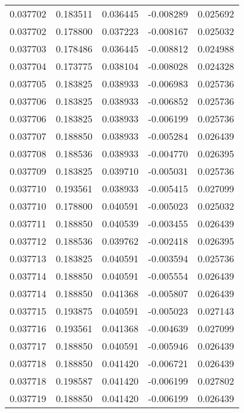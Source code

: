 \begin{tabular}{lrrrr}
0.037702    &  0.183511 &  0.036445 & -0.008289 &             0.025692 \\
0.037702    &  0.178800 &  0.037223 & -0.008167 &             0.025032 \\
0.037703    &  0.178486 &  0.036445 & -0.008812 &             0.024988 \\
0.037704    &  0.173775 &  0.038104 & -0.008028 &             0.024328 \\
0.037705    &  0.183825 &  0.038933 & -0.006983 &             0.025736 \\
0.037706    &  0.183825 &  0.038933 & -0.006852 &             0.025736 \\
0.037706    &  0.183825 &  0.038933 & -0.006199 &             0.025736 \\
0.037707    &  0.188850 &  0.038933 & -0.005284 &             0.026439 \\
0.037708    &  0.188536 &  0.038933 & -0.004770 &             0.026395 \\
0.037709    &  0.183825 &  0.039710 & -0.005031 &             0.025736 \\
0.037710    &  0.193561 &  0.038933 & -0.005415 &             0.027099 \\
0.037710    &  0.178800 &  0.040591 & -0.005023 &             0.025032 \\
0.037711    &  0.188850 &  0.040539 & -0.003455 &             0.026439 \\
0.037712    &  0.188536 &  0.039762 & -0.002418 &             0.026395 \\
0.037713    &  0.183825 &  0.040591 & -0.003594 &             0.025736 \\
0.037714    &  0.188850 &  0.040591 & -0.005554 &             0.026439 \\
0.037714    &  0.188850 &  0.041368 & -0.005807 &             0.026439 \\
0.037715    &  0.193875 &  0.040591 & -0.005023 &             0.027143 \\
0.037716    &  0.193561 &  0.041368 & -0.004639 &             0.027099 \\
0.037717    &  0.188850 &  0.040591 & -0.005946 &             0.026439 \\
0.037718    &  0.188850 &  0.041420 & -0.006721 &             0.026439 \\
0.037718    &  0.198587 &  0.041420 & -0.006199 &             0.027802 \\
0.037719    &  0.188850 &  0.041420 & -0.006199 &             0.026439 \\

\end{tabular}
